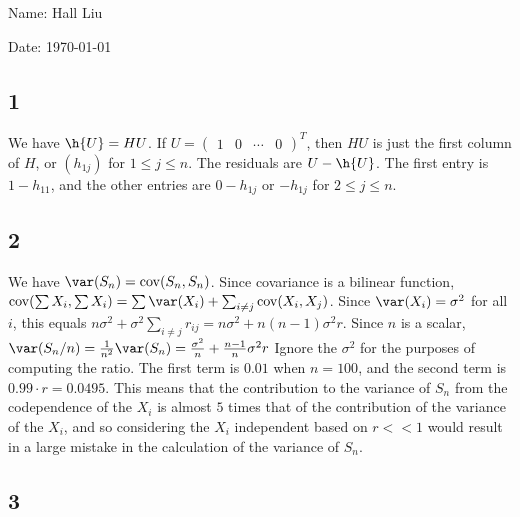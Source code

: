 \documentclass{article}
\newcommand{\openm}{\begin{pmatrix}}
\newcommand{\closem}{\end{pmatrix}}
\DeclareMathOperator{\cov}{cov}
\begin{document}
Name: Hall Liu

Date: \today 
\vspace{1.5cm}

\subsection*{1}
We have $\h{U}=HU$. If $U=\openm1&0&\cdots&0\closem^T$, then $HU$ is just the first column of $H$, or $(h_{1j})$ for $1\leq j\leq n$.
The residuals are $U-\h{U}$. The first entry is $1-h_{11}$, and the other entries are $0-h_{1j}$ or $-h_{1j}$ for $2\leq j\leq n$.
\subsection*{2}
We have $\var(S_n)=\cov(S_n,S_n)$. Since covariance is a bilinear function, $\cov(\sum X_i, \sum X_i)=\sum\var(X_i)+\sum_{i\neq j}\cov(X_i,X_j)$. Since $\var(X_i)=\sigma^2$ for all $i$, this equals $n\sigma^2+\sigma^2\sum_{i\neq j}r_{ij}=n\sigma^2+n(n-1)\sigma^2r$.
Since $n$ is a scalar, $\var(S_n/n)=\frac{1}{n^2}\var(S_n)=\frac{\sigma^2}{n}+\frac{n-1}{n}\sigma^2r$
Ignore the $\sigma^2$ for the purposes of computing the ratio. The first term is $0.01$ when $n=100$, and the second term is $0.99\cdot r=0.0495$. This means that the contribution to the variance of $S_n$ from the codependence of the $X_i$ is almost $5$ times that of the contribution of the variance of the $X_i$, and so considering the $X_i$ independent based on $r<<1$ would result in a large mistake in the calculation of the variance of $S_n$.
\subsection*{3}
\end{document}
